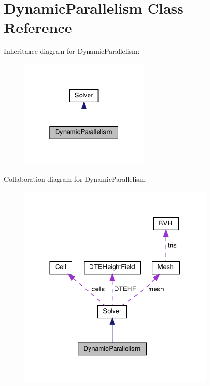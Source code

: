 \hypertarget{classDynamicParallelism}{}\section{Dynamic\+Parallelism Class Reference}
\label{classDynamicParallelism}


Inheritance diagram for Dynamic\+Parallelism\+:
\nopagebreak
\begin{figure}[H]
\begin{center}
\leavevmode
\includegraphics[width=184pt]{classDynamicParallelism__inherit__graph}
\end{center}
\end{figure}


Collaboration diagram for Dynamic\+Parallelism\+:
\nopagebreak
\begin{figure}[H]
\begin{center}
\leavevmode
\includegraphics[width=278pt]{classDynamicParallelism__coll__graph}
\end{center}
\end{figure}
